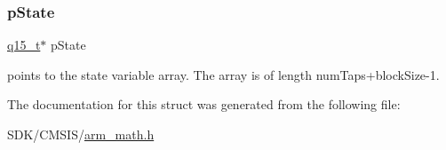 \subsubsection{\texorpdfstring{p\+State}{pState}}
{\footnotesize\ttfamily \mbox{\hyperlink{arm__math_8h_ab5a8fb21a5b3b983d5f54f31614052ea}{q15\+\_\+t}}$\ast$ p\+State}

points to the state variable array. The array is of length num\+Taps+block\+Size-\/1. 

The documentation for this struct was generated from the following file\+:\begin{DoxyCompactItemize}
\item 
S\+D\+K/\+C\+M\+S\+I\+S/\mbox{\hyperlink{arm__math_8h}{arm\+\_\+math.\+h}}\end{DoxyCompactItemize}
